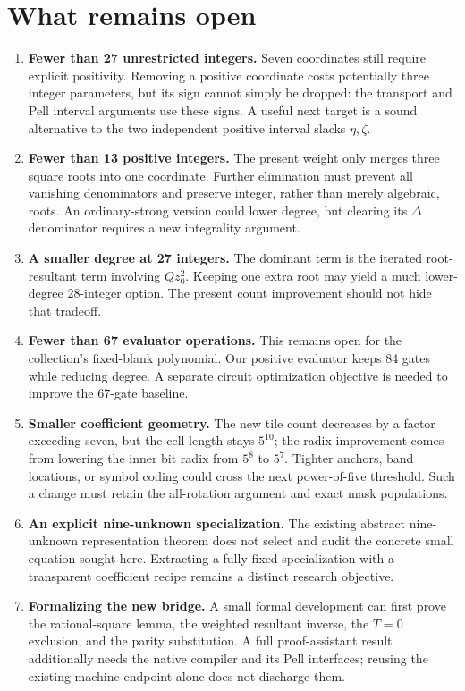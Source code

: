 \documentclass[11pt]{article}
\theoremstyle{definition}\newtheorem{definition}[theorem]{Definition}
\theoremstyle{remark}\newtheorem{remark}[theorem]{Remark}
\begin{document}
\section{What remains open}
\label{sec:questions}
\begin{enumerate}
\item \textbf{Fewer than 27 unrestricted integers.} Seven coordinates still require explicit positivity. Removing a positive coordinate costs potentially three integer parameters, but its sign cannot simply be dropped: the transport and Pell interval arguments use these signs. A useful next target is a sound alternative to the two independent positive interval slacks $\eta,\zeta$.
\item \textbf{Fewer than 13 positive integers.} The present weight only merges three square roots into one coordinate. Further elimination must prevent all vanishing denominators and preserve integer, rather than merely algebraic, roots. An ordinary-strong version could lower degree, but clearing its $\Delta$ denominator requires a new integrality argument.
\item \textbf{A smaller degree at 27 integers.} The dominant term is the iterated root-resultant term involving $Qz_0^2$. Keeping one extra root may yield a much lower-degree 28-integer option. The present count improvement should not hide that tradeoff.
\item \textbf{Fewer than 67 evaluator operations.} This remains open for the collection's fixed-blank polynomial. Our positive evaluator keeps 84 gates while reducing degree. A separate circuit optimization objective is needed to improve the 67-gate baseline.
\item \textbf{Smaller coefficient geometry.} The new tile count decreases by a factor exceeding seven, but the cell length stays $5^{10}$; the radix improvement comes from lowering the inner bit radix from $5^8$ to $5^7$. Tighter anchors, band locations, or symbol coding could cross the next power-of-five threshold. Such a change must retain the all-rotation argument and exact mask populations.
\item \textbf{An explicit nine-unknown specialization.} The existing abstract nine-unknown representation theorem does not select and audit the concrete small equation sought here. Extracting a fully fixed specialization with a transparent coefficient recipe remains a distinct research objective.
\item \textbf{Formalizing the new bridge.} A small formal development can first prove the rational-square lemma, the weighted resultant inverse, the $T=0$ exclusion, and the parity substitution. A full proof-assistant result additionally needs the native compiler and its Pell interfaces; reusing the existing machine endpoint alone does not discharge them.
\end{enumerate}
\end{document}
